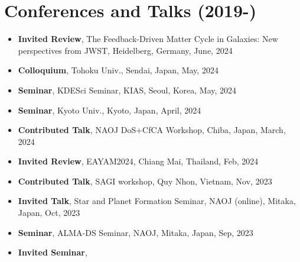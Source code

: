 \documentclass[11pt,letterpaper,roman]{moderncv}        %
\newenvironment{benumerate}[1]{
  \let\oldItem\item
  \def\item{\addtocounter{enumi}{-2}\oldItem}
  \begin{enumerate}[itemsep=0.0mm]
    \setcounter{enumi}{#1}
    \addtocounter{enumi}{1}
  }{
  \end{enumerate}
}
\begin{document}


\section{Conferences and Talks (2019-)}

\begin{itemize}
  \setlength\itemsep{0em}
\item \textbf{Invited Review},
  The Feedback-Driven Matter Cycle in Galaxies: New perspectives from JWST, Heidelberg, Germany, June, 2024 %
\item \textbf{Colloquium},
  Tohoku Univ., Sendai, Japan, May, 2024 %
\item \textbf{Seminar},
  KDESci Seminar, KIAS, Seoul, Korea, May, 2024 %
\item \textbf{Seminar},
  Kyoto Univ., Kyoto, Japan, April, 2024 %
\item \textbf{Contributed Talk},
  NAOJ DoS+CfCA Workshop, Chiba, Japan, March, 2024 %
\item \textbf{Invited Review},
  EAYAM2024, Chiang Mai, Thailand, Feb, 2024 %
\item \textbf{Contributed Talk},
  SAGI workshop, Quy Nhon, Vietnam, Nov, 2023 %
\item \textbf{Invited Talk},
  Star and Planet Formation Seminar, NAOJ (online), Mitaka, Japan, Oct, 2023 %
\item \textbf{Seminar},
  ALMA-DS Seminar, NAOJ, Mitaka, Japan, Sep, 2023 %
\item \textbf{Invited Seminar},

\end{itemize}
\end{document}
